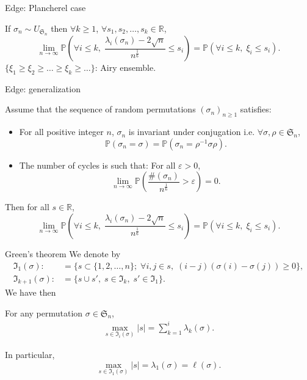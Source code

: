 \documentclass[english,xcolor=table]{beamer}
\begin{document}
\begin{frame}{Edge: Plancherel case}
\begin{theorem} 
 If $\sigma_n \sim {U}_{\mathfrak{S}_n}$ then  $\forall k \geq 1 $,  $\forall s_1,s_2,\dots,s_k \in \mathbb{R}$,
\begin{equation*} 
\lim_{n\to \infty}\mathbb{P}\left(\forall i\leq k, \;\frac{\lambda_i(\sigma_n)-2\sqrt{n}}{n^\frac{1}{6}}\leq s_i\right)=\mathbb{P}(\forall i\leq k,\;\xi_i\leq s_i).
\end{equation*}
$\{\xi_1\geq \xi_2\geq\dots\geq  \xi_k \geq  \dots \}$: Airy ensemble.
\end{theorem}

\end{frame}
\begin{frame}{Edge: generalization}
    \begin{theorem}[\cite{sk}]
Assume that the sequence of random permutations  $(\sigma_n)_{n\geq 1}$ satisfies:
\begin{itemize}
\item  For all positive integer $n$, $\sigma_n$ is invariant under conjugation i.e.  $\forall \sigma , \rho \in \mathfrak{S}_n$,
\begin{equation}\tag{H1}
\mathbb{P}(\sigma_n=\sigma)=\mathbb{P}(\sigma_n=\rho^{-1}\sigma\rho).
\end{equation}
\item The number of cycles is such that: For all $\varepsilon>0$,
\begin{equation}\tag{H2}
\lim_{n\to \infty}\mathbb{P}\left(\frac{\#(\sigma_n)}{n^\frac 16 }>\varepsilon\right) =0.
\end{equation}
\end{itemize}
Then  for all  $s \in \mathbb{R}$,
\begin{equation*} 
\lim_{n\to \infty}\mathbb{P}\left(\forall i\leq k, \;\frac{\lambda_i(\sigma_n)-2\sqrt{n}}{n^\frac{1}{6}}\leq s_i\right)=\mathbb{P}(\forall i\leq k,\;\xi_i\leq s_i).\end{equation*}
\end{theorem}
\end{frame}

\begin{frame}{Green's theorem}
    We denote by  \begin{align*}
\mathfrak{I}_1(\sigma):&=\{s\subset\{1,2,\dots,n\};\; \forall i,j \in s,\; (i-j)(\sigma(i)-\sigma(j))\geq 0 \},
\\\mathfrak{I}_{k+1}(\sigma):&=\{s\cup s',\; s\in \mathfrak{I}_k,\;s'\in \mathfrak{I}_1\}.
\end{align*}
We have then
\begin{lemma}
For any permutation $ \sigma\in \mathfrak{S}_n$,
\begin{align*}
\max_{s\in \mathfrak{I}_i(\sigma)} |s| =\sum_{k=1}^i \lambda_k(\sigma).
\end{align*}
\end{lemma}
In particular, $$\max_{s\in \mathfrak{I}_1(\sigma)} |s| =\lambda_1(\sigma)=\ell(\sigma).$$
\end{frame}
\end{document}
